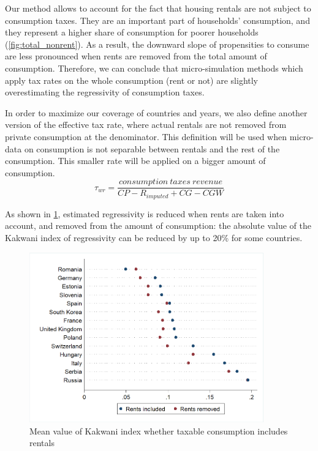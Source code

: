 Our method allows to account for the fact that housing rentals are not subject to consumption taxes. They are an important part of households' consumption, and they represent a higher share of consumption for poorer households (\cref{fig:total_nonrent}). As a result, the downward slope of propensities to consume are less pronounced when rents are removed from the total amount of consumption. Therefore, we can conclude that micro-simulation methods which apply tax rates on the whole consumption (rent or not) are slightly overestimating the regressivity of consumption taxes.

In order to maximize our coverage of countries and years, we also define another version of the effective tax rate, where actual rentals are not removed from private consumption at the denominator. This definition will be used when micro-data on consumption is not separable between rentals and the rest of the consumption. This smaller rate will be applied on a bigger amount of consumption.
\[ \tau_{wr}= \frac{consumption\ taxes\ revenue}{CP - R_{imputed} + CG - CGW}\]

As shown in \cref{fig:kakrent}, estimated regressivity is reduced when rents are taken into account, and removed from the amount of consumption: the absolute value of the Kakwani index of regressivity can be reduced by up to 20\% for some countries.

\begin{figure}
\centering
\includegraphics[width=0.9\textwidth]{images/18-03-18_kak_kak_wor_mean}
\caption{\label{fig:kakrent} Mean value of Kakwani index whether taxable consumption includes rentals}
\end{figure}

